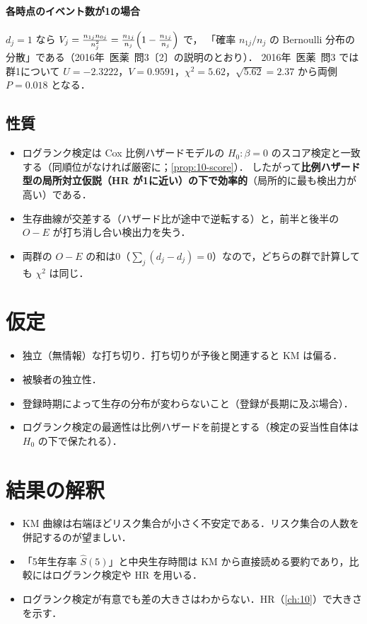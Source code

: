 \documentclass[a4paper,11pt,openany]{ltjsbook}
\newcommand{\kakomon}[2]{\mbox{#1年 医薬 問#2}}
\begin{document}
\paragraph{各時点のイベント数が1の場合}
$d_j=1$ なら $V_j=\frac{n_{1j}n_{0j}}{n_j^2}=\frac{n_{1j}}{n_j}\Bigl(1-\frac{n_{1j}}{n_j}\Bigr)$ で，
「確率 $n_{1j}/n_j$ の Bernoulli 分布の分散」である（\kakomon{2016}{3}〔2〕の説明のとおり）．
\kakomon{2016}{3} では群1について $U=-2.3222$，$V=0.9591$，$\chi^2=5.62$，$\sqrt{5.62}=2.37$ から両側 $P=0.018$ となる．

\subsection{性質}
\begin{itemize}
\item ログランク検定は Cox 比例ハザードモデルの $H_0:\beta=0$ のスコア検定と一致する（同順位がなければ厳密に；\cref{prop:10-score}）．
      したがって\textbf{比例ハザード型の局所対立仮説（HR が1に近い）の下で効率的}（局所的に最も検出力が高い）である．
\item 生存曲線が交差する（ハザード比が途中で逆転する）と，前半と後半の $O-E$ が打ち消し合い検出力を失う．
\item 両群の $O-E$ の和は0（$\sum_j(d_j-d_j)=0$）なので，どちらの群で計算しても $\chi^2$ は同じ．
\end{itemize}

\section{仮定}\label{sec:09-assump}
\begin{itemize}
\item 独立（無情報）な打ち切り．打ち切りが予後と関連すると KM は偏る．
\item 被験者の独立性．
\item 登録時期によって生存の分布が変わらないこと（登録が長期に及ぶ場合）．
\item ログランク検定の最適性は比例ハザードを前提とする（検定の妥当性自体は $H_0$ の下で保たれる）．
\end{itemize}

\section{結果の解釈}\label{sec:09-interp}
\begin{itemize}
\item KM 曲線は右端ほどリスク集合が小さく不安定である．リスク集合の人数を併記するのが望ましい．
\item 「5年生存率 $\hat S(5)$」と中央生存時間は KM から直接読める要約であり，比較にはログランク検定や HR を用いる．
\item ログランク検定が有意でも差の大きさはわからない．HR（\cref{ch:10}）で大きさを示す．
\end{itemize}
\end{document}
